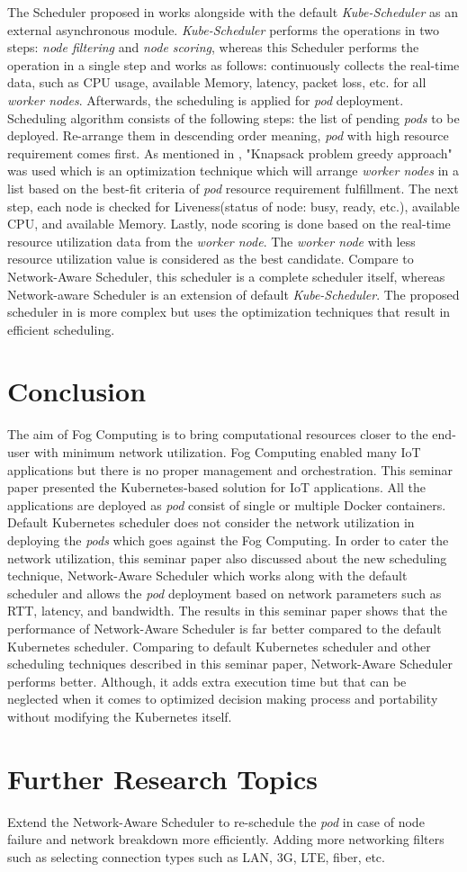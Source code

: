 The Scheduler proposed in \cite{8903766} works alongside with the default \emph{Kube-Scheduler} as an external asynchronous module. \emph{Kube-Scheduler} performs the operations in two steps: \emph{node filtering} and \emph{node scoring}, whereas this Scheduler\cite{8903766} performs the operation in a single step and works as follows: continuously collects the real-time data, such as CPU usage, available Memory, latency, packet loss, etc.  for all \emph{worker nodes}. Afterwards, the scheduling is applied for \emph{pod} deployment. Scheduling algorithm consists of the following steps\cite{8903766}: the list of pending \emph{pods} to be deployed. Re-arrange them in descending order meaning, \emph{pod} with high resource requirement comes first. As mentioned in \cite{8903766}, "Knapsack problem greedy approach" was used which is an optimization technique which will arrange \emph{worker nodes} in a list based on the best-fit criteria of \emph{pod} resource requirement fulfillment. The next step, each node is checked for Liveness(status of node: busy, ready, etc.), available CPU, and available Memory\cite{8903766}. Lastly, node scoring is done based on the real-time resource utilization data from the \emph{worker node}\cite{8903766}. The \emph{worker node} with less resource utilization value is considered as the best candidate\cite{8903766}. Compare to Network-Aware Scheduler\cite{Santos2019}, this scheduler\cite{8903766} is a complete scheduler itself, whereas Network-aware Scheduler\cite{Santos2019} is an extension of default \emph{Kube-Scheduler}. The proposed scheduler in \cite{8903766} is more complex but uses the optimization techniques that result in efficient scheduling.

\section{Conclusion}
\label{sec:concl}
The aim of Fog Computing is to bring computational resources closer to the end-user with minimum network utilization. Fog Computing enabled many IoT applications but there is no proper management and orchestration. This seminar paper presented the Kubernetes-based solution for IoT applications. All the applications are deployed as \emph{pod} consist of single or multiple Docker containers. Default Kubernetes scheduler does not consider the network utilization in deploying the \emph{pods} which goes against the Fog Computing. In order to cater the network utilization, this seminar paper also discussed about the new scheduling technique, Network-Aware Scheduler which works along with the default scheduler and allows the \emph{pod} deployment based on network parameters such as RTT, latency, and bandwidth. The results in this seminar paper shows that the performance of Network-Aware Scheduler is far better compared to the default Kubernetes scheduler. Comparing to default Kubernetes scheduler and other scheduling techniques described in this seminar paper, Network-Aware Scheduler performs better. Although, it adds extra execution time but that can be neglected when it comes to optimized decision making process and portability without modifying the Kubernetes itself.  
\section{Further Research Topics}
\label{sec:research}
Extend the Network-Aware Scheduler to re-schedule the \emph{pod} in case of node failure and network breakdown more efficiently. Adding more networking filters such as selecting connection types such as LAN, 3G, LTE, fiber, etc.